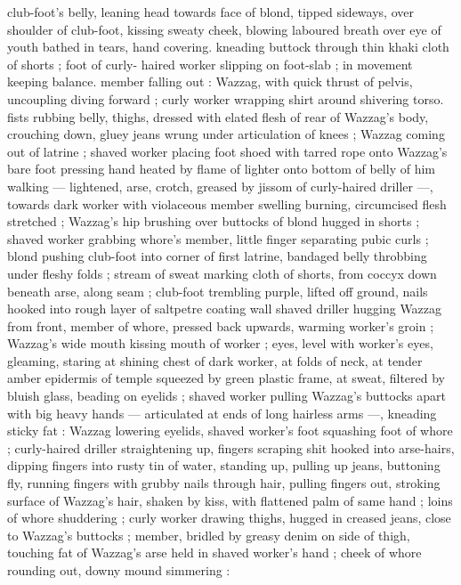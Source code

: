 club-foot's belly, leaning head towards face of blond, tipped 
sideways, over shoulder of club-foot, kissing sweaty cheek, blowing 
laboured breath over eye of youth bathed in tears, hand covering. 
kneading buttock through thin khaki cloth of shorts ; foot of curly- 
haired worker slipping on foot-slab ; in movement keeping balance. 
member falling out : Wazzag, with quick thrust of pelvis, uncoupling 
diving forward ; curly worker wrapping shirt around shivering torso. 
fists rubbing belly, thighs, dressed with elated flesh of rear of 
Wazzag's body, crouching down, gluey jeans wrung under 
articulation of knees ; Wazzag coming out of latrine ; shaved worker 
placing foot shoed with tarred rope onto Wazzag's bare foot 
pressing hand heated by flame of lighter onto bottom of belly of him 
walking --- lightened, arse, crotch, greased by jissom of curly-haired 
driller ---, towards dark worker with violaceous member swelling 
burning, circumcised flesh stretched ; Wazzag's hip brushing over 
buttocks of blond hugged in shorts ; shaved worker grabbing 
whore's member, little finger separating pubic curls ; blond pushing 
club-foot into corner of first latrine, bandaged belly throbbing under 
fleshy folds ; stream of sweat marking cloth of shorts, from coccyx 
down beneath arse, along seam ; club-foot trembling purple, lifted 
off ground, nails hooked into rough layer of saltpetre coating wall 
shaved driller hugging Wazzag from front, member of whore, 
pressed back upwards, warming worker's groin ; Wazzag's wide 
mouth kissing mouth of worker ; eyes, level with worker's eyes, 
gleaming, staring at shining chest of dark worker, at folds of neck, at 
tender amber epidermis of temple squeezed by green plastic frame, 
at sweat, filtered by bluish glass, beading on eyelids ; shaved worker 
pulling Wazzag's buttocks apart with big heavy hands --- articulated 
at ends of long hairless arms ---, kneading sticky fat : Wazzag 
lowering eyelids, shaved worker's foot squashing foot of whore ; 
curly-haired driller straightening up, fingers scraping shit hooked 
into arse-hairs, dipping fingers into rusty tin of water, standing up, 
pulling up jeans, buttoning fly, running fingers with grubby nails 
through hair, pulling fingers out, stroking surface of Wazzag's hair, 
shaken by kiss, with flattened palm of same hand ; loins of whore 
shuddering ; curly worker drawing thighs, hugged in creased jeans, 
close to Wazzag's buttocks ; member, bridled by greasy denim on 
side of thigh, touching fat of Wazzag's arse held in shaved worker's 
hand ; cheek of whore rounding out, downy mound simmering : 
